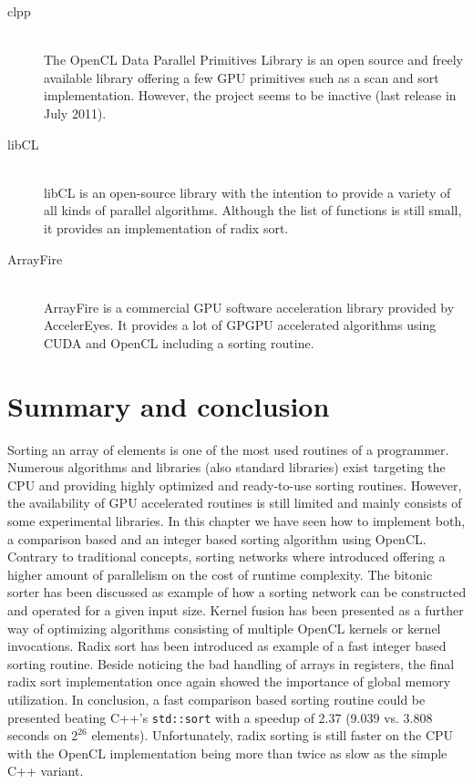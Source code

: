 \begin{description}
	\item[clpp \cite{clpp}] \hfill \\
	The OpenCL Data Parallel Primitives Library is an open source and freely available library offering a few GPU primitives such as a scan and sort implementation. However, the project seems to be inactive (last release in July 2011).
	\item[libCL \cite{libCL}] \hfill \\
	libCL is an open-source library with the intention to provide a variety of all kinds of parallel algorithms. Although the list of functions is still small, it provides an implementation of radix sort.
	\item[ArrayFire \cite{arrayfire}] \hfill \\
	ArrayFire is a commercial GPU software acceleration library provided by AccelerEyes. It provides a lot of GPGPU accelerated algorithms using CUDA and OpenCL including a sorting routine.
\end{description}

\section{Summary and conclusion}
Sorting an array of elements is one of the most used routines of a programmer. Numerous algorithms and libraries (also standard libraries) exist targeting the CPU and providing highly optimized and ready-to-use sorting routines. However, the availability of GPU accelerated routines is still limited and mainly consists of some experimental libraries. In this chapter we have seen how to implement both, a comparison based and an integer based sorting algorithm using OpenCL. Contrary to traditional concepts, sorting networks where introduced offering a higher amount of parallelism on the cost of runtime complexity. The bitonic sorter has been discussed as example of how a sorting network can be constructed and operated for a given input size. Kernel fusion has been presented as a further way of optimizing algorithms consisting of multiple OpenCL kernels or kernel invocations. Radix sort has been introduced as example of a fast integer based sorting routine. Beside noticing the bad handling of arrays in registers, the final radix sort implementation once again showed the importance of global memory utilization.
In conclusion, a fast comparison based sorting routine could be presented beating C++'s \lstinline!std::sort! with a speedup of 2.37 (9.039 vs. 3.808 seconds on $2^{26}$ elements). Unfortunately, radix sorting is still faster on the CPU with the OpenCL implementation being more than twice as slow as the simple C++ variant.
